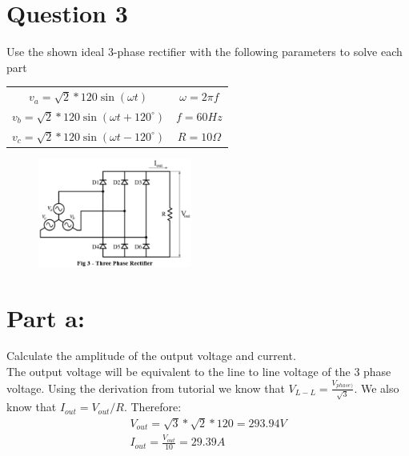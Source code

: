 \documentclass{article}
\begin{document}
\section{Question 3}
Use the shown ideal 3-phase rectifier with the following parameters to solve each part

\begin{center}
\begin{tabular}{ c   c }
    $v_a = \sqrt{2} * 120\sin{(\omega t)}$ & $\omega = 2 \pi f$ \\ 
    $v_b = \sqrt{2} * 120\sin{(\omega t +120^{\circ})}$ & $f=60Hz$  \\  
    $v_c = \sqrt{2} * 120\sin{(\omega t -120^{\circ})}$ & $R = 10 \Omega$   
\end{tabular}
\end{center}

\begin{figure}[h]
    \centering
    \includegraphics[width=0.45\textwidth]{q3-circuit}
    \label{Circuit q3}
\end{figure}

\section*{Part a:}
Calculate the amplitude of the output voltage and current. \\

The output voltage will be equivalent to the line to line voltage of the 3 phase voltage. Using the derivation from tutorial we know that $V_{L-L} = \frac{V_{phase)}}{\sqrt{3}}$. We also know that $I_{out} = V_{out} / R$. Therefore:
\begin{align*}
    V_{out} = \sqrt{3}*\sqrt{2}*120 = 293.94 V \\
    I_{out} = \frac{V_{out}}{10} = 29.39 A
\end{align*}
\end{document}
